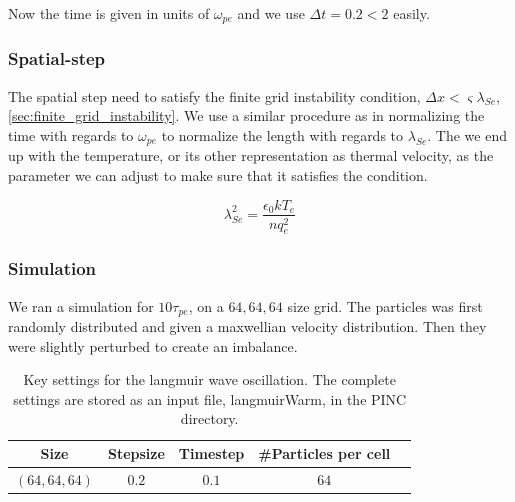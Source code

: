         Now the time is given in units of \(\omega_{pe}\) and we use \(\Delta t = 0.2 < 2\) easily.

        \subsubsection{Spatial-step}
        The spatial step need to satisfy the finite grid instability condition,
        \(\Delta x < \varsigma \lambda_{Se}\), \cref{sec:finite_grid_instability}.
        We use a similar procedure as in normalizing the time with regards to \(\omega_{pe}\)
        to normalize the length with regards to \(\lambda_{Se}\). The we end up with
        the temperature, or its other representation as thermal velocity, as the parameter we can adjust to make sure that it satisfies the
        condition.

        \begin{equation}
            \lambda_{Se}^2 = \frac{\epsilon_0 kT_e}{nq^2_e}
        \end{equation}

		\subsubsection{Simulation}
			We ran a simulation for \(10\tau_{pe}\), on a \(64,64,64\) size grid. The particles
			was first randomly distributed and given a maxwellian velocity distribution.
			Then they were slightly perturbed to create an imbalance. 

			\begin{table}
			\begin{tabular}{c|c|c|c|c}
				Size 			&	Stepsize &	Timestep &\#Particles per cell
				\\ \hline
				\((64,64,64)\)	& \(0.2\)	& \(0.1\)  	&	\(64\)
			\end{tabular}
			\caption{Key settings for the langmuir wave oscillation. The complete settings are
			stored as an input file, langmuirWarm, in the PINC directory.}
			\end{table}


